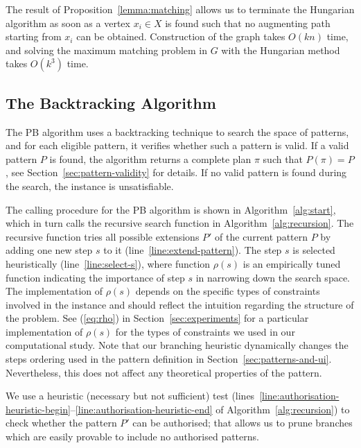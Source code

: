 \documentclass[runningheads,proof]{llncs}
\begin{document}
The result of Proposition~\ref{lemma:matching} allows us to terminate the Hungarian algorithm as soon as a vertex $x_i \in X$ is found such that no augmenting path starting from $x_i$ can be obtained.
Construction of the graph takes $O(kn)$ time, and solving the maximum matching problem in $G$ with the Hungarian method takes $O(k^3)$ time.



\subsection{The Backtracking Algorithm}
\label{sec:pb-backtracking}

The PB algorithm uses a backtracking technique to search the space of patterns, and for each eligible pattern, it verifies whether such a pattern is valid.  
If a valid pattern $P$ is found, the algorithm returns a complete plan $\pi$ such that $P(\pi) = P$, see Section~\ref{sec:pattern-validity} for details.  
If no valid pattern is found during the search, the instance is unsatisfiable.


The calling procedure for the PB algorithm is shown in Algorithm~\ref{alg:start}, which in turn calls the recursive search function in Algorithm~\ref{alg:recursion}. 
The recursive function tries all possible extensions $P'$ of the current pattern $P$ by adding one new step $s$ to it (line~\ref{line:extend-pattern}).
The step $s$ is selected heuristically (line~\ref{line:select-s}), where function $\rho(s)$ is an empirically tuned function indicating the importance of step $s$ in narrowing down the search space.  
The implementation of $\rho(s)$ depends on the specific types of constraints involved in the instance and should reflect the intuition regarding the structure of the problem.
See (\ref{eq:rho}) in Section~\ref{sec:experiments} for a particular implementation of $\rho(s)$ for the types of constraints we used in our computational study.
Note that our branching heuristic dynamically changes the steps ordering used in the pattern definition in Section~\ref{sec:patterns-and-ui}.
Nevertheless, this does not affect any theoretical properties of the pattern.

We use a heuristic (necessary but not sufficient) test (lines~\ref{line:authorisation-heuristic-begin}--\ref{line:authorisation-heuristic-end} of Algorithm~\ref{alg:recursion}) to check whether the pattern $P'$ can be authorised; that allows us to prune branches which are easily provable to include no authorised patterns.
\end{document}
